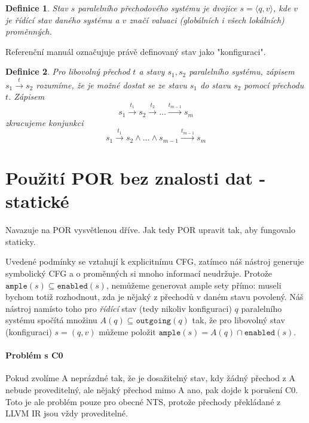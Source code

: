 \documentclass[10pt,a4paper,notitlepage]{report}
\newtheorem{definition}{Definice}
\newcommand{\tuple}[1]{\langle #1 \rangle}
\begin{document}
\begin{definition}
Stav $s$ paralelního přechodového systému je dvojice $s = \tuple{q, v}$, kde $v$ je řídící stav daného systému a $v$ značí valuaci (globálních i všech lokálních) proměnných.
\end{definition}
Referenční manuál označujuje právě definovaný stav jako "konfiguraci".

\begin{definition}
Pro libovolný přechod $t$ a stavy $s_1, s_2$ paralelního systému, zápisem $s_1 \xrightarrow{t} s_2$ rozumíme, že je možné dostat se ze stavu $s_1$ do stavu $s_2$ pomocí přechodu $t$. Zápisem
\begin{equation*}
s_1 \xrightarrow{t_1} s_2 \xrightarrow{t_2} \ldots \xrightarrow{t_{m-1}} s_m
\end{equation*}
zkracujeme konjunkci
\begin{equation*}
s_1 \xrightarrow{t_1} s_2 \land \ldots \land s_{m-1} \xrightarrow{t_{m-1}} s_m
\end{equation*}
\end{definition}

\section{Použití POR bez znalosti dat - statické}
Navazuje na POR vysvětlenou dříve. Jak tedy POR upravit tak, aby fungovalo staticky.


Uvedené podmínky se vztahují k explicitnímu CFG, zatímco náš nástroj generuje symbolický CFG a o proměnných si mnoho informací neudržuje. Protože $\texttt{ample}(s) \subseteq \texttt{enabled}(s)$, nemůžeme generovat ample sety přímo: museli bychom totiž rozhodnout, zda je nějaký z přechodů v daném stavu povolený. Náš nástroj namísto toho pro \textit{řídící} stav (tedy nikoliv konfiguraci) $q$ paralelního systému spočítá množinu $A(q) \subseteq \texttt{outgoing}(q)$ tak, že pro libovolný stav (konfiguraci) $s = (q, v)$ můžeme položit $\texttt{ample}(s) = A(q) \cap \texttt{enabled}(s)$.

\paragraph{Problém s C0}
Pokud zvolíme A neprázdné tak, že je dosažitelný stav, kdy žádný přechod z A nebude proveditelný, ale nějaký přechod mimo A ano, pak dojde k porušení C0. Toto je ale problém pouze pro obecné NTS, protože přechody překládané z LLVM IR jsou vždy proveditelné. 
\end{document}
